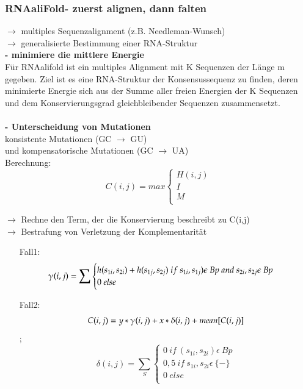 \subsubsection{RNAaliFold- zuerst alignen, dann falten}
$\rightarrow$ multiples Sequenzalignment (z.B. Needleman-Wunsch) \\
$\rightarrow$ generalisierte Bestimmung einer RNA-Struktur \\

\textbf{- minimiere die mittlere Energie} \\
Für RNAalifold ist ein multiples Alignment mit K Sequenzen der Länge m gegeben. Ziel ist es eine RNA-Struktur der Konsensussequenz zu finden, deren minimierte Energie sich aus der Summe aller freien Energien der K Sequenzen und dem Konservierungsgrad gleichbleibender Sequenzen zusammensetzt.\\
\\
\textbf{- Unterscheidung von Mutationen} \\
konsistente Mutationen (GC $\rightarrow$ GU) \\
und kompensatorische Mutationen (GC $\rightarrow$ UA) \\ 

Berechnung:
\begin{equation}
C(i,j)= max
\begin{cases} 
H(i,j)\\ 
I\\ 
M\\
\end{cases}
\end{equation}

$\rightarrow$  Rechne den Term, der die Konservierung beschreibt zu C(i,j) \\
$\rightarrow$ Bestrafung von Verletzung der Komplementarität\\
\begin{itemize}
	\item[Fall1:] 
	\begin{equation}
	\gammaup(i,j)= \sum 
	\begin{cases} 
	h(s_{1i},s_{2i}) + h(s_{1j},s_{2j}) \ if\ s_{1i},s_{1j}) \epsilon\ Bp \ and \ s_{2i},s_{2j} \epsilon\ Bp \\
	0 \ else\\
	\end{cases} 
	\end{equation}	
	\item [Fall2:] 
	\begin{equation} 
	C(i,j)= y * \gammaup (i,j) + x * \delta (i,j)+ mean[C(i,j)]  
	\end{equation} ;
	\begin{equation}	 
	\delta(i,j)= \sum_{S} 
	\begin{cases} 
	0 \ if\ (s_{1i},s_{2i}) \epsilon\ Bp \\
	0,5 \ if\ s_{1i},s_{2i} \epsilon\ \{-\} \\ 
	0 \ else\\
	\end{cases}
	\end{equation}
\end{itemize}

